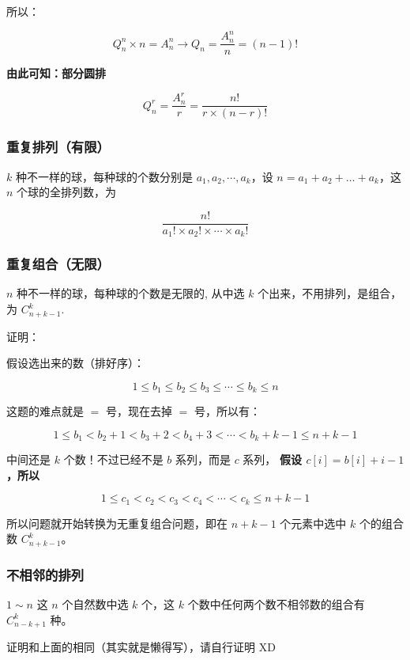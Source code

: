 所以：

$$
Q_n^n \times n = A_n^n → Q_n = \frac{A_n^n}{n} = (n-1)!
$$

\textbf{ 由此可知：部分圆排 }

$$
Q_n^r = \frac{A_n^r}{r} = \frac{n!}{r \times (n-r)!}
$$

\subsubsection{重复排列（有限）}

$k$ 种不一样的球，每种球的个数分别是 $a_1,a_2,\cdots,a_k$，设 $n=a_1+a_2+…+a_k$，这 $n$ 个球的全排列数，为

$$
\frac{n!}{a_1! \times a_2! \times \cdots \times a_k!}
$$

\subsubsection{重复组合（无限）}

$n$ 种不一样的球，每种球的个数是无限的, 从中选 $k$ 个出来，不用排列，是组合，为 $C_{n+k-1}^{k}$.

证明：

\begin{QUOTE}{}{}
假设选出来的数（排好序）：
\end{QUOTE}

$$
1 \le b_1 \le b_2 \le b_3 \le \cdots \le b_k \le n
$$

\begin{QUOTE}{}{}
这题的难点就是 $=$ 号，现在去掉 $=$ 号，所以有：
\end{QUOTE}

$$
1 \le b_1 < b_2+1 < b_3+2 < b_4+3 < \cdots < b_k+k-1 \le n+k-1
$$

中间还是 $k$ 个数！不过已经不是 $b$ 系列，而是 $c$ 系列，\textbf{ 假设 $c[i]=b[i]+i-1$，所以 }

$$
1 \le c_1 < c_2 < c_3 < c_4 < \cdots < c_k \le n+k-1
$$

所以问题就开始转换为无重复组合问题，即在 $n+k-1$ 个元素中选中 $k$ 个的组合数 $C_{n+k-1}^{k}$。

\subsubsection{不相邻的排列}

$1 \sim n$ 这 $n$ 个自然数中选 $k$ 个，这 $k$ 个数中任何两个数不相邻数的组合有 $C_{n-k+1}^{k}$ 种。  

证明和上面的相同（其实就是懒得写），请自行证明 XD

